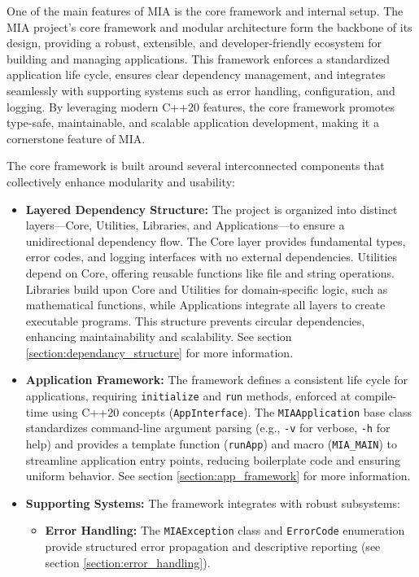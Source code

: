 One of the main features of MIA is the core framework and internal setup. The MIA project's core framework and modular architecture form the backbone of its design, providing a robust, extensible, and developer-friendly ecosystem for building and managing applications. This framework enforces a standardized application life cycle, ensures clear dependency management, and integrates seamlessly with supporting systems such as error handling, configuration, and logging. By leveraging modern C++20 features, the core framework promotes type-safe, maintainable, and scalable application development, making it a cornerstone feature of MIA.

The core framework is built around several interconnected components that collectively enhance modularity and usability:
\begin{itemize}\itemsep0em
	\item \textbf{Layered Dependency Structure:} The project is organized into distinct layers---Core, Utilities, Libraries, and Applications---to ensure a unidirectional dependency flow. The Core layer provides fundamental types, error codes, and logging interfaces with no external dependencies. Utilities depend on Core, offering reusable functions like file and string operations. Libraries build upon Core and Utilities for domain-specific logic, such as mathematical functions, while Applications integrate all layers to create executable programs. This structure prevents circular dependencies, enhancing maintainability and scalability. See section \ref{section:dependancy_structure} for more information.
	\item \textbf{Application Framework:} The framework defines a consistent life cycle for applications, requiring \texttt{initialize} and \texttt{run} methods, enforced at compile-time using C++20 concepts (\texttt{AppInterface}). The \texttt{MIAApplication} base class standardizes command-line argument parsing (e.g., \texttt{-v} for verbose, \texttt{-h} for help) and provides a template function (\texttt{runApp}) and macro (\texttt{MIA\_MAIN}) to streamline application entry points, reducing boilerplate code and ensuring uniform behavior. See section \ref{section:app_framework} for more information.
	\item \textbf{Supporting Systems:} The framework integrates with robust subsystems:
	\begin{itemize}\itemsep0em
		\item \textbf{Error Handling:} The \texttt{MIAException} class and \texttt{ErrorCode} enumeration provide structured error propagation and descriptive reporting (see section \ref{section:error_handling}).

\end{itemize}
\end{itemize}
